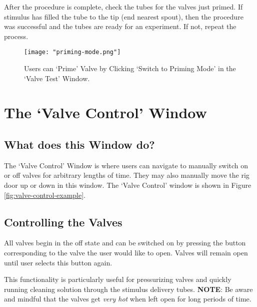 \documentclass{article}
\begin{document}
After the procedure is complete, check the tubes for the valves just primed. If stimulus has filled the tube to the tip (end nearest spout), 
then the procedure was successful and the tubes are ready for an experiment. If not, repeat the process.

\begin{figure}[h!]
    \centering
    \texttt{[image: "priming-mode.png"]}
    \caption{Users can `Prime' Valve by Clicking `Switch to Priming Mode' in the `Valve Test' Window.}
    \label{fig:priming-mode}
\end{figure}
\FloatBarrier

\clearpage
\section{The `Valve Control' Window}
\label{sec:valve-control}
\subsection{What does this Window do?}
The `Valve Control' Window is where users can navigate to manually switch on or off valves for arbitrary lengths of time. They may also manually move the rig door up or
down in this window. The `Valve Control' window is shown in Figure \ref{fig:valve-control-example}.

\subsection{Controlling the Valves}
All valves begin in the off state and can be switched on by pressing the button corresponding to the valve the user would like to open.  
Valves will remain open until user selects this button again. 

This functionality is particularly useful 
for pressurizing valves and quickly running cleaning solution through the stimulus delivery tubes. 
\newline
\newline
\textbf{NOTE}: Be aware and mindful that the valves get \textit{very hot} when left open for long periods of time. 
\end{document}
